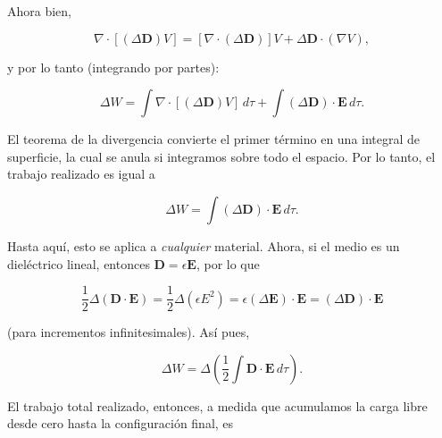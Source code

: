 \documentclass[12pt,a4paper]{report}
\newcommand{\esp}{\vspace{0.5cm}}
\begin{document}
	\esp
	
	\noindent Ahora bien,
	
	\esp
	
	\begin{equation}
		\nabla \cdot [(\Delta \mathbf{D})V] = [\nabla \cdot (\Delta \mathbf{D})]V + \Delta \mathbf{D} \cdot (\nabla V),
	\end{equation}
	
	\esp
	
	\noindent y por lo tanto (integrando por partes):
	
	\esp
	
	\begin{equation}
		\Delta W = \int \nabla \cdot [(\Delta \mathbf{D})V] \, d\tau + \int (\Delta \mathbf{D}) \cdot \mathbf{E} \, d\tau.
	\end{equation}
	
	\esp
	
	\noindent El teorema de la divergencia convierte el primer término en una integral de superficie, la cual se anula si integramos sobre todo el espacio. Por lo tanto, el trabajo realizado es igual a
	
	\esp
	
	\begin{equation}
		\Delta W = \int (\Delta \mathbf{D}) \cdot \mathbf{E} \, d\tau.
	\end{equation}
	
	\esp
	
	\noindent Hasta aquí, esto se aplica a \textit{cualquier} material. Ahora, si el medio es un dieléctrico lineal, entonces $\mathbf{D} = \epsilon \mathbf{E}$, por lo que
	
	\esp
	
	\begin{equation}
		\frac{1}{2} \Delta (\mathbf{D} \cdot \mathbf{E}) = \frac{1}{2} \Delta (\epsilon E^2) = \epsilon (\Delta \mathbf{E}) \cdot \mathbf{E} = (\Delta \mathbf{D}) \cdot \mathbf{E}
	\end{equation}
	
	\esp
	
	\noindent (para incrementos infinitesimales). Así pues,
	
	\esp
	
	\begin{equation}
		\Delta W = \Delta \left( \frac{1}{2} \int \mathbf{D} \cdot \mathbf{E} \, d\tau \right).
	\end{equation}
	
	\esp
	
	\noindent El trabajo total realizado, entonces, a medida que acumulamos la carga libre desde cero hasta la configuración final, es
	
\end{document}
